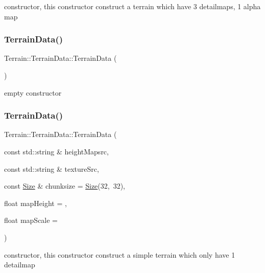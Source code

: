 constructor, this constructor construct a terrain which have 3 detailmaps, 1 alpha map \mbox{\label{structTerrain_1_1TerrainData_aea03e8a06e607b652c467e4fd475e0de}} 
\subsubsection{\texorpdfstring{Terrain\+Data()}{TerrainData()}\hspace{0.1cm}{\footnotesize\ttfamily [5/8]}}
{\footnotesize\ttfamily Terrain\+::\+Terrain\+Data\+::\+Terrain\+Data (\begin{DoxyParamCaption}{ }\end{DoxyParamCaption})}

empty constructor \mbox{\label{structTerrain_1_1TerrainData_a75bf963bf55942f9fcced98ac047d318}} 
\subsubsection{\texorpdfstring{Terrain\+Data()}{TerrainData()}\hspace{0.1cm}{\footnotesize\ttfamily [6/8]}}
{\footnotesize\ttfamily Terrain\+::\+Terrain\+Data\+::\+Terrain\+Data (\begin{DoxyParamCaption}\item[{const std\+::string \&}]{height\+Mapsrc,  }\item[{const std\+::string \&}]{texture\+Src,  }\item[{const \hyperlink{classSize}{Size} \&}]{chunksize = {\ttfamily \hyperlink{classSize}{Size}(32,~32)},  }\item[{float}]{map\+Height = {},  }\item[{float}]{map\+Scale = {} }\end{DoxyParamCaption})}

constructor, this constructor construct a simple terrain which only have 1 detailmap \mbox{\label{structTerrain_1_1TerrainData_a1e4a1574d2ff07e15b3118c3b2396199}} 
